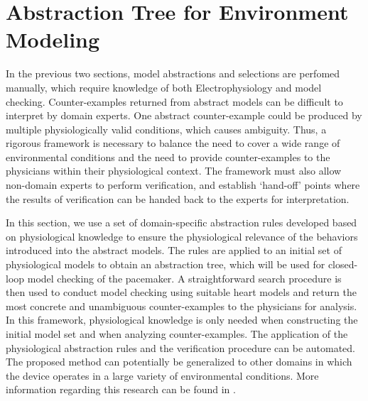 \section{Abstraction Tree for Environment Modeling}
In the previous two sections, model abstractions and selections are perfomed manually, which require knowledge of both Electrophysiology and model checking. 
Counter-examples returned from abstract models can be difficult to interpret by domain experts.
One abstract counter-example could be produced by multiple physiologically valid conditions, which causes ambiguity.
Thus, a rigorous framework is necessary to balance the need to cover a wide range of environmental conditions and the need to provide counter-examples to the physicians within their physiological context. The framework must also allow non-domain experts to perform verification, and establish `hand-off' points where the results of verification can be handed back 
to the experts for interpretation.

In this section, we use a set of domain-specific abstraction rules developed based on physiological knowledge to ensure the physiological relevance of the behaviors introduced into the abstract models.
The rules are applied to an initial set of physiological models to obtain an abstraction tree, which will be used for closed-loop model checking of the pacemaker. 
A straightforward search procedure is then used to conduct model checking using suitable heart models and return the most concrete and unambiguous counter-examples to the physicians for analysis.
In this framework, physiological knowledge is only needed when constructing the initial model set and when analyzing counter-examples. 
The application of the physiological abstraction rules and the verification procedure can be automated.
The proposed method can potentially be generalized to other domains in which the device operates in a large variety of environmental conditions. More information regarding this research can be found in \cite{regar_tech}.
